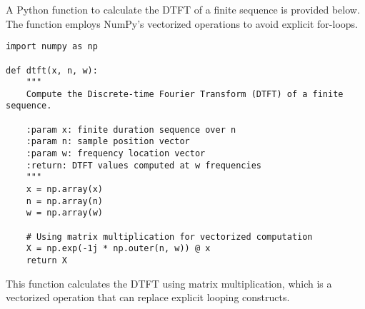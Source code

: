 
\item[(a)]
A Python function to calculate the DTFT of a finite sequence is provided below.
The function employs NumPy's vectorized operations to avoid explicit for-loops.

\begin{verbatim}
import numpy as np

def dtft(x, n, w):
    """
    Compute the Discrete-time Fourier Transform (DTFT) of a finite sequence.

    :param x: finite duration sequence over n
    :param n: sample position vector
    :param w: frequency location vector
    :return: DTFT values computed at w frequencies
    """
    x = np.array(x)
    n = np.array(n)
    w = np.array(w)

    # Using matrix multiplication for vectorized computation
    X = np.exp(-1j * np.outer(n, w)) @ x
    return X
\end{verbatim}

This function calculates the DTFT using matrix multiplication, which is a vectorized operation
that can replace explicit looping constructs.

